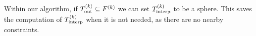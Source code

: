 Within our algorithm, if $ {T_{\text{out}}^{(k)}} \subseteq {F}^{(k)}$ we can set $ {T_{\text{interp}}^{(k)}} $ to be a sphere.
This saves the computation of $ {T_{\text{interp}}^{(k)}} $ when it is not needed, as there are no nearby constraints.






% 




